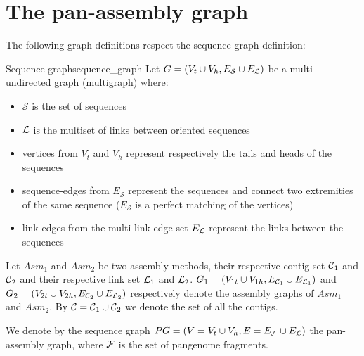 \section{The pan-assembly graph}

The following graph definitions respect the sequence graph definition:

\begin{definition}
  {Sequence graph}{sequence_graph} Let
  \(G = (V_{t}\cup V_{h}, E_{\mathcal{S}} \cup E_{\mathcal{L}}{})\) be a multi-undirected
  graph (multigraph) where:

  \begin{itemize}
    \item \(\mathcal{S}\) is the set of sequences

    \item \(\mathcal{L}{}\) is the multiset of links between oriented sequences

    \item vertices from \(V_{t}\) and \(V_{h}\) represent respectively the tails
      and heads of the sequences

    \item sequence-edges from \(E_{\mathcal{S}}\) represent the sequences and connect
      two extremities of the same sequence (\(E_{\mathcal{S}}\) is a perfect
      matching of the vertices)

    \item link-edges from the multi-link-edge set \(E_{\mathcal{L}}{}\) represent
      the links between the sequences
  \end{itemize}
\end{definition}

Let \(Asm_{1}\) and \(Asm_{2}\) be two assembly methods, their respective contig set \(\mathcal{C}{}_{1}\) and \(\mathcal{C}{}_{2}\) and their respective link set \(\mathcal{L}{}_{1}\) and \(\mathcal{L}{}_{2}\).
\(G_{1}= (V_{1t}\cup V_{1h}, E_{\mathcal{C}{}_1}\cup E_{\mathcal{L}{}_1})\) and \(G_{2}= (V_{2t}\cup V_{2h}, E_{\mathcal{C}{}_2}\cup E_{\mathcal{L}{}_2})\) respectively denote the assembly graphs of \(Asm_{1}\) and \(Asm_{2}\). By \(\mathcal{C}{} = \mathcal{C}{}_1 \cup \mathcal{C}{}_2\) we denote the set of all the contigs.

We denote by the sequence graph \(PG = (V = V_t \cup V_h, E = E_{\mathcal{F}}{} \cup E_{\mathcal{L}}{})\) the pan-assembly graph, where \(\mathcal{F}{}\) is the set of pangenome fragments.






